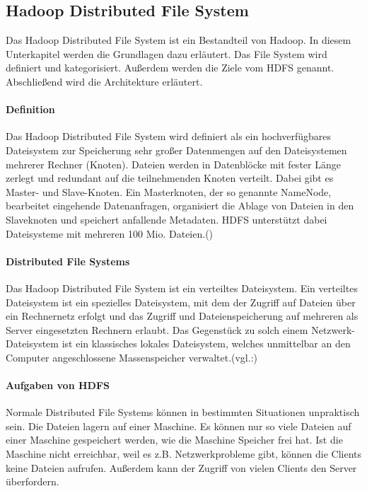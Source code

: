 \subsection{Hadoop Distributed File System}
Das Hadoop Distributed File System ist ein Bestandteil von Hadoop. In diesem Unterkapitel werden die Grundlagen dazu erläutert. Das File System wird definiert und kategorisiert. Außerdem werden die Ziele vom HDFS genannt. Abschließend wird die Architekture erläutert.  
 

\paragraph{Definition}$\;$ \\
Das Hadoop Distributed File System wird definiert als ein \glqq hochverfügbares Dateisystem zur Speicherung sehr großer Datenmengen auf den Dateisystemen mehrerer Rechner (Knoten). Dateien werden in Datenblöcke mit fester Länge zerlegt und redundant auf die teilnehmenden Knoten verteilt. Dabei gibt es Master- und Slave-Knoten. Ein Masterknoten, der so genannte NameNode, bearbeitet eingehende Datenanfragen, organisiert die Ablage von Dateien in den Slaveknoten und speichert anfallende Metadaten. HDFS unterstützt dabei Dateisysteme mit mehreren 100 Mio. Dateien.\grqq (\cite{defhad})

\paragraph{Distributed File Systems}$\;$ \\
Das Hadoop Distributed File System ist ein verteiltes Dateisystem. Ein verteiltes Dateisystem ist ein spezielles Dateisystem, mit dem der Zugriff auf Dateien über ein Rechnernetz erfolgt und das Zugriff und Dateienspeicherung auf mehreren als Server eingesetzten Rechnern erlaubt. Das Gegenstück zu solch einem Netzwerk-Dateisystem ist ein klassisches lokales Dateisystem, welches unmittelbar an den Computer angeschlossene Massenspeicher verwaltet.(vgl.:\cite{distributfs})

\paragraph{Aufgaben von HDFS}$\;$ \\
Normale Distributed File Systems können in bestimmten Situationen unpraktisch sein. Die Dateien lagern auf einer Maschine. Es können nur so viele Dateien auf einer Maschine gespeichert werden, wie die Maschine Speicher frei hat. Ist die Maschine nicht erreichbar, weil es z.B. Netzwerkprobleme gibt, können die Clients keine Dateien aufrufen. Außerdem kann der Zugriff von vielen Clients den Server überfordern.

